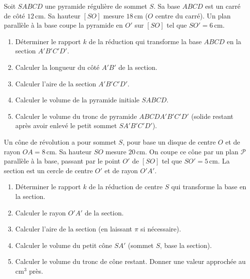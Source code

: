 \documentclass[11pt]{article}
\begin{document}
\begin{exercice}
Soit $SABCD$ une pyramide régulière de sommet $S$. Sa base $ABCD$ est un carré de côté $12\,\text{cm}$. Sa hauteur $[SO]$ mesure $18\,\text{cm}$ ($O$ centre du carré).
Un plan parallèle à la base coupe la pyramide en $O'$ sur $[SO]$ tel que $SO' = 6\,\text{cm}$.
\begin{enumerate}
    \item Déterminer le rapport $k$ de la réduction qui transforme la base $ABCD$ en la section $A'B'C'D'$.
    \item Calculer la longueur du côté $A'B'$ de la section.
    \item Calculer l'aire de la section $A'B'C'D'$.
    \item Calculer le volume de la pyramide initiale $SABCD$.
    \item Calculer le volume du tronc de pyramide $ABCDA'B'C'D'$ (solide restant après avoir enlevé le petit sommet $SA'B'C'D'$).
\end{enumerate}
\end{exercice}

\begin{exercice}
Un cône de révolution a pour sommet $S$, pour base un disque de centre $O$ et de rayon $OA = 8\,\text{cm}$. Sa hauteur $SO$ mesure $20\,\text{cm}$.
On coupe ce cône par un plan $\mathcal{P}$ parallèle à la base, passant par le point $O'$ de $[SO]$ tel que $SO' = 5\,\text{cm}$. La section est un cercle de centre $O'$ et de rayon $O'A'$.
\begin{enumerate}
    \item Déterminer le rapport $k$ de la réduction de centre $S$ qui transforme la base en la section.
    \item Calculer le rayon $O'A'$ de la section.
    \item Calculer l'aire de la section (en laissant $\pi$ si nécessaire).
    \item Calculer le volume du petit cône $SA'$ (sommet $S$, base la section).
    \item Calculer le volume du tronc de cône restant. Donner une valeur approchée au $\text{cm}^3$ près.
\end{enumerate}
\end{exercice}
\end{document}
